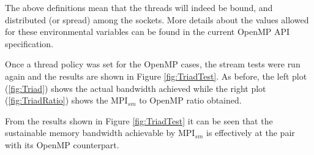 The above definitions mean that the threads will indeed be bound, and distributed (or spread) among the sockets. More details about the values allowed for these environmental variables can be found in the current OpenMP API specification.

\medskip

Once a thread policy was set for the OpenMP cases, the stream tests were run again and the results are shown in Figure \ref{fig:TriadTest}. As before, the left plot (\ref{fig:Triad}) shows the actual bandwidth achieved while the right plot (\ref{fig:TriadRatio}) shows the MPI$_{sm}$ to OpenMP ratio obtained. 

\medskip
From the results shown in Figure \ref{fig:TriadTest} it can be seen that the sustainable memory bandwidth achievable by MPI$_{sm}$ is effectively at the pair with its OpenMP counterpart.



